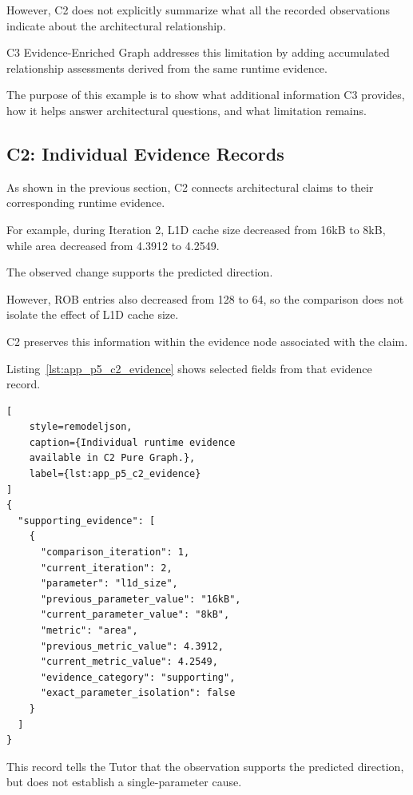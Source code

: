 However, C2 does not explicitly
summarize what all the recorded
observations indicate about
the architectural relationship.

C3 Evidence-Enriched Graph
addresses this limitation by adding
accumulated relationship assessments
derived from the same runtime evidence.

The purpose of this example is
to show what additional information
C3 provides, how it helps answer
architectural questions, and
what limitation remains.


\subsection{C2: Individual Evidence Records}

As shown in the previous section,
C2 connects architectural claims
to their corresponding runtime evidence.

For example, during Iteration 2,
L1D cache size decreased from
16kB to 8kB, while area decreased
from 4.3912 to 4.2549.

The observed change supports
the predicted direction.

However, ROB entries also decreased
from 128 to 64, so the comparison
does not isolate the effect
of L1D cache size.

C2 preserves this information
within the evidence node
associated with the claim.

Listing~\ref{lst:app_p5_c2_evidence}
shows selected fields from
that evidence record.

\begin{lstlisting}[
    style=remodeljson,
    caption={Individual runtime evidence
    available in C2 Pure Graph.},
    label={lst:app_p5_c2_evidence}
]
{
  "supporting_evidence": [
    {
      "comparison_iteration": 1,
      "current_iteration": 2,
      "parameter": "l1d_size",
      "previous_parameter_value": "16kB",
      "current_parameter_value": "8kB",
      "metric": "area",
      "previous_metric_value": 4.3912,
      "current_metric_value": 4.2549,
      "evidence_category": "supporting",
      "exact_parameter_isolation": false
    }
  ]
}
\end{lstlisting}

This record tells the Tutor
that the observation supports
the predicted direction,
but does not establish
a single-parameter cause.

